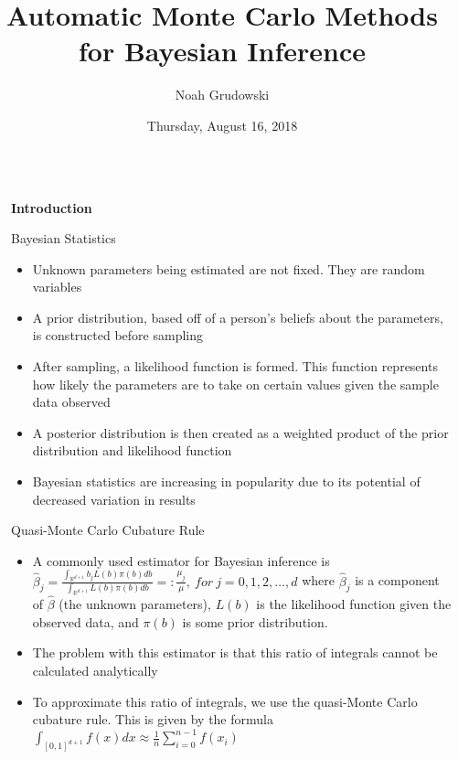 \documentclass[final,mathserif]{beamer}
\title{Automatic Monte Carlo Methods for Bayesian Inference}
\author{Noah Grudowski}
\institute{Applied Mathematics, Illinois Institute of
Technology}
\date{Thursday, August 16, 2018}
\newcommand{\blue}[1]{{\color{myblue}#1}}
\renewcommand{\blue}{\textcolor{blue!80!black}}
\begin{document}
\vspace*{-1.5ex}
\begin{frame}[fragile]

\begin{columns}[t]

\begin{column}{.02\linewidth}\end{column} %

\begin{column}{.31\linewidth} %

{\Large \alert{\textbf{Introduction}}}

\vspace{.1in}

\begin{block}{\blue{Bayesian Statistics}}
\begin{itemize}
\item Unknown parameters being estimated are not fixed.  They are random variables
\item A prior distribution, based off of a person's beliefs about the parameters, is constructed before sampling
\item After sampling, a likelihood function is formed.  This function represents how likely the parameters are to take on certain values given the sample data observed
\item A posterior distribution is then created as a weighted product of the prior distribution and likelihood function
\item Bayesian statistics are increasing in popularity due to its potential of decreased variation in results
\end{itemize}
\end{block}

\vspace{.1in}

\begin{block}{\blue{Quasi-Monte Carlo Cubature Rule}}
\begin{itemize}
\item A commonly used estimator for Bayesian inference is $\hat{\beta}_j=\frac{\int_{\mathbb{R}^{d+1}}b_jL(b)\pi(b)db}{\int_{\mathbb{R}^{d+1}}L(b)\pi(b)db} =: \frac{\mu_j}{\mu}, ~for\ j=0, 1, 2,\ldots, d$
where $\hat{\beta}_j$ is a component of $\hat{\beta}$ (the unknown parameters), $L(b)$ is the likelihood function given the observed data, and $\pi(b)$ is some prior distribution.
\item The problem with this estimator is that this ratio of integrals cannot be calculated analytically
\item To approximate this ratio of integrals, we use the quasi-Monte Carlo cubature rule.  This is given by the formula $\int_{[0, 1]^{d+1}}f(x)dx\approx \frac{1}{n} \sum_{i=0}^{n-1}f({x_i})$
\end{itemize}
\end{block}


\end{column}
\end{columns}
\end{frame}
\end{document}
